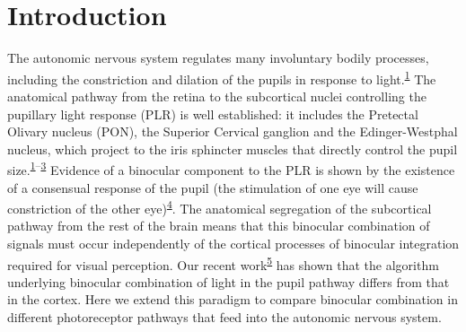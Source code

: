 \documentclass[
]{article}
\begin{document}
\hypertarget{introduction}{%
\section{Introduction}\label{introduction}}

The autonomic nervous system regulates many involuntary bodily processes, including the constriction and dilation of the pupils in response to light.\textsuperscript{\protect\hyperlink{ref-McDougal2015}{1}} The anatomical pathway from the retina to the subcortical nuclei controlling the pupillary light response (PLR) is well established: it includes the Pretectal Olivary nucleus (PON), the Superior Cervical ganglion and the Edinger-Westphal nucleus, which project to the iris sphincter muscles that directly control the pupil size.\textsuperscript{\protect\hyperlink{ref-McDougal2015}{1}--\protect\hyperlink{ref-Wang2015}{3}} Evidence of a binocular component to the PLR is shown by the existence of a consensual response of the pupil (the stimulation of one eye will cause constriction of the other eye)\textsuperscript{\protect\hyperlink{ref-Wyatt1981}{4}}. The anatomical segregation of the subcortical pathway from the rest of the brain means that this binocular combination of signals must occur independently of the cortical processes of binocular integration required for visual perception. Our recent work\textsuperscript{\protect\hyperlink{ref-Segala2023}{5}} has shown that the algorithm underlying binocular combination of light in the pupil pathway differs from that in the cortex. Here we extend this paradigm to compare binocular combination in different photoreceptor pathways that feed into the autonomic nervous system.
\end{document}
